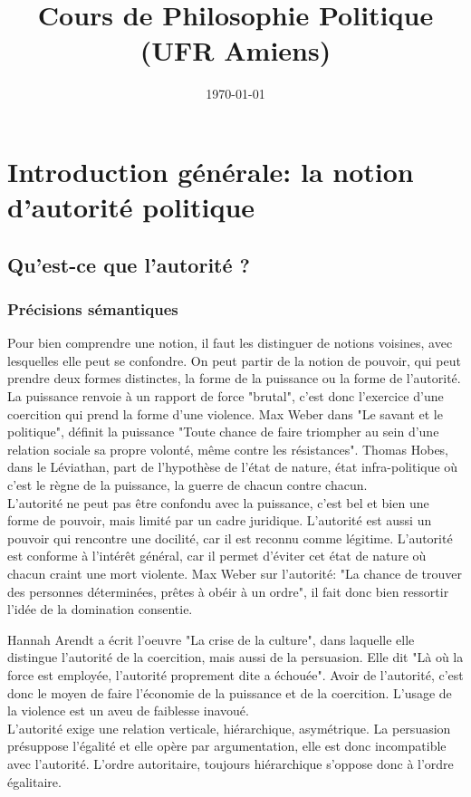 \documentclass[10pt, a4paper, openany]{book}
\date{\today}
\title{Cours de Philosophie Politique (UFR Amiens)}
\begin{document}
\maketitle
\tableofcontents

\chapter{Introduction générale: la notion d'autorité politique}

\section{Qu'est-ce que l'autorité ?}

\subsection{Précisions sémantiques}

Pour bien comprendre une notion, il faut les distinguer de notions voisines, avec lesquelles elle peut se confondre. On peut partir de la notion de pouvoir, qui peut prendre deux formes distinctes, la forme de la puissance ou la forme de l'autorité. \\
La puissance renvoie à un rapport de force "brutal", c'est donc l'exercice d'une coercition qui prend la forme d'une violence. Max Weber dans "Le savant et le politique", définit la puissance "Toute chance de faire triompher au sein d'une relation sociale sa propre volonté, même contre les résistances". Thomas Hobes, dans le Léviathan, part de l'hypothèse de l'état de nature, état infra-politique où c'est le règne de la puissance, la guerre de chacun contre chacun. \\
L'autorité ne peut pas être confondu avec la puissance, c'est bel et bien une forme de pouvoir, mais limité par un cadre juridique. L'autorité est aussi un pouvoir qui rencontre une docilité, car il est reconnu comme légitime. L'autorité est conforme à l'intérêt général, car il permet d'éviter cet état de nature où chacun craint une mort violente. Max Weber sur l'autorité: "La chance de trouver des personnes déterminées, prêtes à obéir à un ordre", il fait donc bien ressortir l'idée de la domination consentie.


Hannah Arendt a écrit l'oeuvre "La crise de la culture", dans laquelle elle distingue l'autorité de la coercition, mais aussi de la persuasion. Elle dit "Là où la force est employée, l'autorité proprement dite a échouée". Avoir de l'autorité, c'est donc le moyen de faire l'économie de la puissance et de la coercition. L'usage de la violence est un aveu de faiblesse inavoué. \\
L'autorité exige une relation verticale, hiérarchique, asymétrique. La persuasion présuppose l'égalité et elle opère par argumentation, elle est donc incompatible avec l'autorité. L'ordre autoritaire, toujours hiérarchique s'oppose donc à l'ordre égalitaire. 
\end{document}
